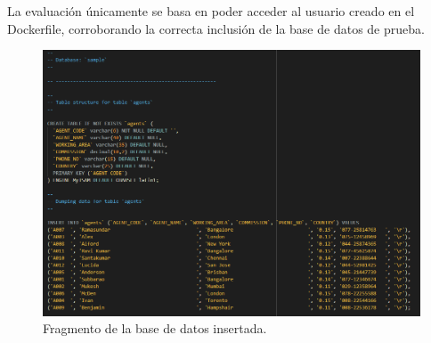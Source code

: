 La evaluación únicamente se basa en poder acceder al usuario creado en el Dockerfile, corroborando la correcta inclusión de la base de datos de prueba.

\begin{figure}[H]\center\includegraphics[width=.95\linewidth]{img/sgbd/s4.png}\caption{Fragmento de la base de datos insertada.}\end{figure}